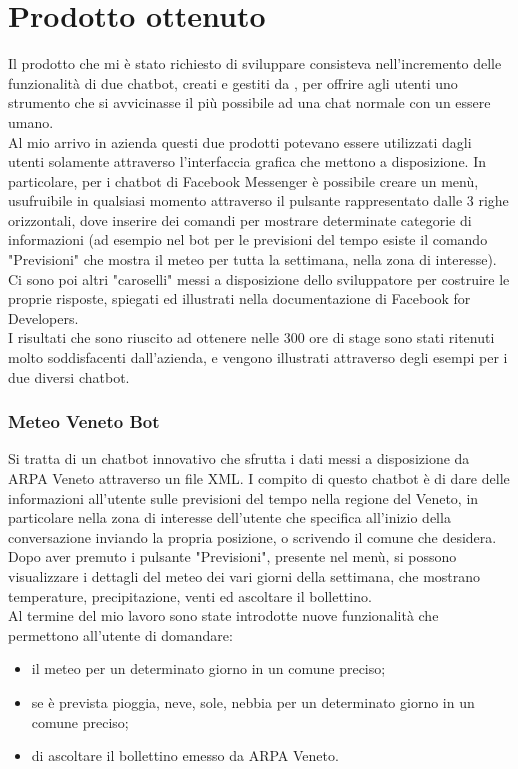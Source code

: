 \section{Prodotto ottenuto}
Il prodotto che mi è stato richiesto di sviluppare consisteva nell'incremento delle funzionalità di due \gls{chatbot}, creati e gestiti da \azienda{}, per offrire agli utenti uno strumento che si avvicinasse il più possibile ad una chat normale con un essere umano.\\
Al mio arrivo in azienda questi due prodotti potevano essere utilizzati dagli utenti solamente attraverso l'interfaccia grafica che mettono a disposizione. In particolare, per i \gls{chatbot} di Facebook Messenger è possibile creare un menù, usufruibile in qualsiasi momento attraverso il pulsante rappresentato dalle 3 righe orizzontali, dove inserire dei comandi per mostrare determinate categorie di informazioni (ad esempio nel bot per le previsioni del tempo esiste il comando "Previsioni" che mostra il meteo per tutta la settimana, nella zona di interesse). Ci sono poi altri "caroselli" messi a disposizione dello sviluppatore per costruire le proprie risposte, spiegati ed illustrati nella documentazione di Facebook for Developers.\\

I risultati che sono riuscito ad ottenere nelle 300 ore di stage sono stati ritenuti molto soddisfacenti dall'azienda, e vengono illustrati attraverso degli esempi per i due diversi \gls{chatbot}.

\subsubsection{Meteo Veneto Bot}
Si tratta di un \gls{chatbot} innovativo che sfrutta i dati messi a disposizione da ARPA Veneto attraverso un file XML. I compito di questo  \gls{chatbot} è di dare delle informazioni all'utente sulle previsioni del tempo nella regione del Veneto, in particolare nella zona di interesse dell'utente che specifica all'inizio della conversazione inviando la propria posizione, o scrivendo il comune che desidera. Dopo aver premuto i pulsante "Previsioni", presente nel menù, si possono visualizzare i dettagli del meteo dei vari giorni della settimana, che mostrano temperature, precipitazione, venti ed ascoltare il bollettino.\\
Al termine del mio lavoro sono state introdotte nuove funzionalità che permettono all'utente di domandare:
\begin{itemize}
	\item il meteo per un determinato giorno in un comune preciso;
	\item se è prevista pioggia, neve, sole, nebbia per un determinato giorno in un comune preciso;
	\item di ascoltare il bollettino emesso da ARPA Veneto.
\end{itemize}

